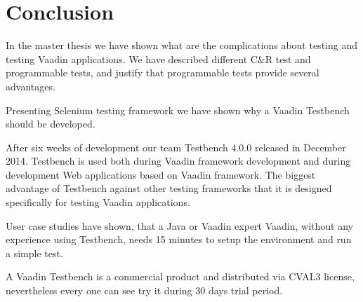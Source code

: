 \chapter {Conclusion}
\label{ch:conclusion}
	
In the master thesis we have shown what are the complications about testing and
testing Vaadin applications. We have described different C\&R test and
programmable tests, and justify that programmable tests provide several
advantages.

Presenting Selenium testing framework we have shown why a Vaadin Testbench
should be developed.

After six weeks of development our team Testbench 4.0.0 released in December
2014. Testbench is used both during Vaadin framework development and during development Web applications
based on Vaadin framework. The biggest advantage of Testbench against other testing frameworks 
that it is designed specifically for testing Vaadin applications.

 User case studies have shown, that a Java or Vaadin expert Vaadin,
 without any experience using Testbench, needs 15 minutes to setup the
 environment and run a simple test.
 
 A Vaadin Testbench is a commercial product and distributed via CVAL3 license,
 nevertheless every one can see try it during 30 days trial period.